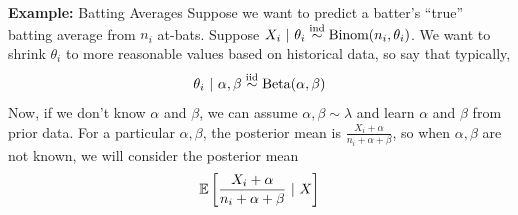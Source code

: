 
\begin{example}{\textbf{Example:} Batting Averages}
    Suppose we want to predict a batter's ``true'' batting average from $n_i$ at-bats. Suppose $X_i \ |\  \theta_i \overset{\text{ind}}{\sim} \text{Binom}(n_i, \theta_i)$. We want to shrink $\theta_i$ to more reasonable values based on historical data, so say that typically,
    \[ \theta_i \ |\  \alpha, \beta \overset{\text{iid}}{\sim} \text{Beta}(\alpha, \beta) \]
    Now, if we don't know $\alpha$ and $\beta$, we can assume $\alpha, \beta \sim \lambda$ and learn $\alpha$ and $\beta$ from prior data. For a particular $\alpha, \beta$, the posterior mean is $\frac{X_i + \alpha}{n_i + \alpha + \beta}$, so when $\alpha, \beta$ are not known, we will consider the posterior mean
    \[ \mathbb{E}\left[\frac{X_i + \alpha}{n_i + \alpha + \beta} \ |\  X\right] \]
\end{example}


